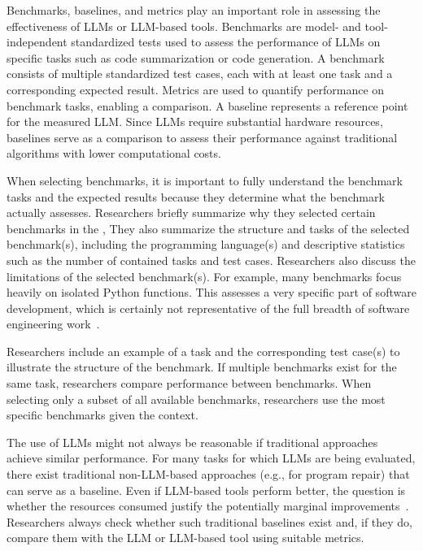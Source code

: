 
Benchmarks, baselines, and metrics play an important role in assessing the effectiveness of LLMs or LLM-based tools.
Benchmarks are model- and tool-independent standardized tests used to assess the performance of LLMs on specific tasks such as code summarization or code generation.
A benchmark consists of multiple standardized test cases, each with at least one task and a corresponding expected result.
Metrics are used to quantify performance on benchmark tasks, enabling a comparison.
A baseline represents a reference point for the measured LLM.
Since LLMs require substantial hardware resources, baselines serve as a comparison to assess their performance against traditional algorithms with lower computational costs.

When selecting benchmarks, it is important to fully understand the benchmark tasks and the expected results because they determine what the benchmark actually assesses.
Researchers \must briefly summarize why they selected certain benchmarks in the \paper, 
They \should also summarize the structure and tasks of the selected benchmark(s), including the programming language(s) and descriptive statistics such as the number of contained tasks and test cases.
Researchers \should also discuss the limitations of the selected benchmark(s).
For example, many benchmarks focus heavily on isolated Python functions.
This assesses a very specific part of software development, which is certainly not representative of the full breadth of software engineering work~\cite{Chandra2025benchmarks}.

Researchers \may include an example of a task and the corresponding test case(s) to illustrate the structure of the benchmark.
If multiple benchmarks exist for the same task, researchers \should compare performance between benchmarks.
When selecting only a subset of all available benchmarks, researchers \should use the most specific benchmarks given the context.

The use of LLMs might not always be reasonable if traditional approaches achieve similar performance. 
For many tasks for which LLMs are being evaluated, there exist traditional non-LLM-based approaches (e.g., for program repair) that can serve as a baseline.
Even if LLM-based tools perform better, the question is whether the resources consumed justify the potentially marginal improvements~\cite{DBLP:journals/cacm/Menzies25}.
Researchers \should always check whether such traditional baselines exist and, if they do, compare them with the LLM or LLM-based tool using suitable metrics.

